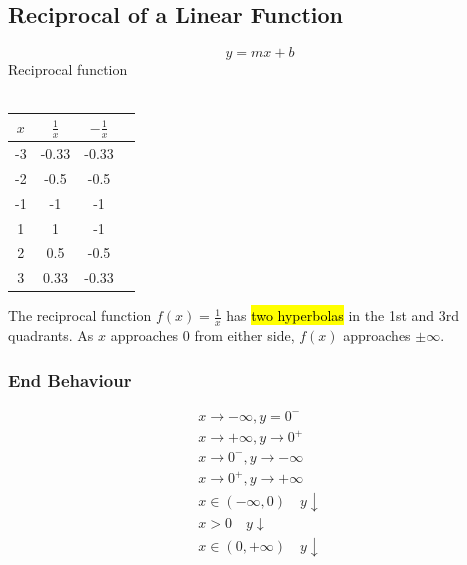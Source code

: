 \documentclass{article}
\begin{document}
\subsection{Reciprocal of a Linear Function}
$$y=mx+b$$
Reciprocal function\\\\
\begin{minipage}{0.5\textwidth}
\end{minipage}
\hspace{1cm}
\begin{minipage}{0.4\textwidth}
\centering
\begin{tabular}{|c|c|c|c|}

$x$ & $\frac{1}{x}$ & $-\frac{1}{x}$ \\ 
\hline
-3 & -0.33 & -0.33 \\
\hline
-2 & -0.5 & -0.5 \\
\hline
-1 & -1 & -1 \\
\hline
1 & 1 & -1 \\
\hline 
2 & 0.5 & -0.5 \\
\hline
3 & 0.33 & -0.33 \\

\end{tabular}
\end{minipage}
\noindent
The reciprocal function $f(x) = \frac{1}{x}$ has \hl{two hyperbolas} in the 1st and 3rd quadrants. As $x$ approaches 0 from either side, $f(x)$ approaches $\pm\infty$. 
\subsubsection{End Behaviour}
\begin{align*}
    x \to -\infty, y=0^-\\
    x \to +\infty, y\to 0^+\\
    x \to 0^-, y \to-\infty\\
    x\to 0^+, y\to+\infty\\
    x\in (-\infty,0) \quad y \downarrow \\
    x > 0 \quad  y \downarrow \\
    x \in (0, +\infty) \quad y \downarrow 
\end{align*}
\end{document}
